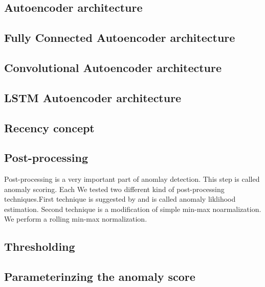 \documentclass[12pt]{article}
\begin{document}
\subsection{Autoencoder architecture}
\subsection{Fully Connected Autoencoder architecture}
\subsection{Convolutional Autoencoder architecture}
\subsection{LSTM Autoencoder architecture}
\subsection{Recency concept}
\subsection{Post-processing}
Post-processing is a very important part of anomlay detection. This step is called anomaly scoring. Each We tested two different kind of post-processing techniques.First technique is suggested by \cite{2017unsupervised} and is called anomaly liklihood estimation. Second technique is a modification of simple min-max noarmalization. We perform a rolling min-max normalization. \\
\break

\subsection{Thresholding}

\subsection{Parameterinzing the anomaly score}
\end{document}

